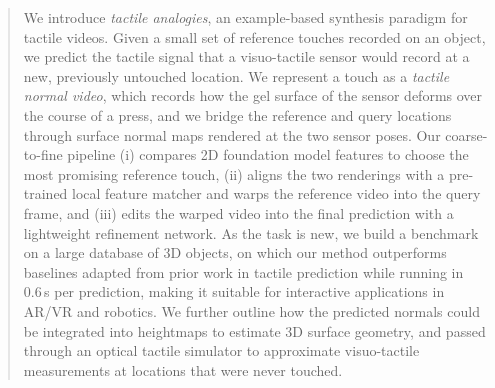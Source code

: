 \begin{abstract}
We introduce \emph{tactile analogies}, an example-based synthesis paradigm for tactile videos.
Given a small set of reference touches recorded on an object, we predict the tactile signal that a
visuo-tactile sensor would record at a new, previously untouched location. We represent a touch as
a \emph{tactile normal video}, which records how the gel surface of the sensor deforms over the
course of a press, and we bridge the reference and query locations through surface normal maps
rendered at the two sensor poses. Our coarse-to-fine pipeline (i) compares 2D foundation model features to choose the most promising
reference touch, (ii) aligns the two renderings with a pre-trained local feature matcher and warps
the reference video into the query frame, and (iii) edits the warped video into the final
prediction with a lightweight refinement network.
As the task is new, we build a benchmark on a large database of 3D objects, on which our method
outperforms baselines adapted from prior work in tactile prediction while running in 0.6\,s per
prediction, making it suitable for interactive applications in AR/VR and robotics. We further
outline how the predicted normals could be integrated into heightmaps to estimate 3D surface
geometry, and passed through an optical tactile simulator to approximate visuo-tactile measurements
at locations that were never touched.
\end{abstract}
